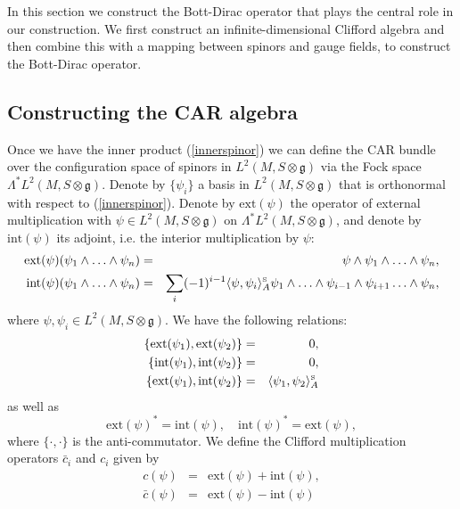 \documentclass[12pt]{article}
\newcommand{\nn}{\nonumber}
\begin{document}
In this section we construct the Bott-Dirac operator that plays the central role in our construction. We first construct an infinite-dimensional Clifford algebra and then combine this with a mapping between spinors and gauge fields, to construct the Bott-Dirac operator. 






\subsection{Constructing the CAR algebra}




Once we have the inner product (\ref{innerspinor}) we can define the CAR bundle over the configuration space of spinors in $L^2(M,S\otimes \mathfrak{g})$ via the Fock space $\Lambda^* L^2(M,S\otimes \mathfrak{g})$. Denote by $\{\psi_i\}$ a basis in $L^2(M,S\otimes \mathfrak{g})$ that is orthonormal with respect to (\ref{innerspinor}).
Denote by $\mbox{ext}(\psi)$ the operator of external multiplication with $\psi\in L^2(M,S\otimes \mathfrak{g})$ on $\Lambda^*L^2(M,S\otimes \mathfrak{g})$, and denote by $\mbox{int}(\psi)$ its adjoint, i.e. the interior multiplication by $\psi$:
\begin{eqnarray}
\mbox{ext}(\psi) (\psi_1 \wedge  \ldots \wedge \psi_n) &=&  \psi\wedge \psi_1 \wedge  \ldots \wedge \psi_n,
\nn\\
\mbox{int} (\psi) (\psi_1 \wedge  \ldots \wedge \psi_n) &=& \sum_i (-1)^{i-1} \langle \psi, \psi_i \rangle_A^{\mbox{\tiny S}} \psi_1 \wedge \ldots \wedge \psi_{i-1} \wedge \psi_{i+1} \ldots \wedge \psi_n,
\nn
\end{eqnarray}
where $\psi, \psi_i\in L^2(M,S\otimes \mathfrak{g})$. We have the following relations:
\begin{eqnarray}
\{\mbox{ext}(\psi_1), \mbox{ext}(\psi_2)  \} &=& 0,
\nn\\
\{\mbox{int}(\psi_1), \mbox{int}(\psi_2)  \} &=& 0,
\nn\\
\{\mbox{ext}(\psi_1), \mbox{int}(\psi_2)  \} &=& \langle \psi_1, \psi_2 \rangle_A^{\mbox{\tiny S}}  
\end{eqnarray}
as well as
$$
\mbox{ext}(\psi)^* = \mbox{int}(\psi),\quad \mbox{int}(\psi)^* = \mbox{ext}(\psi),
$$
where $\{\cdot,\cdot\}$ is the anti-commutator. We define  the Clifford multiplication operators $\bar{c}_i$ and $c_i$ given by
\begin{eqnarray}
  c(\psi) &=& \mbox{ext}(\psi) + \mbox{int}(\psi),
\nn\\
 \bar{c}(\psi) &=& \mbox{ext}(\psi) - \mbox{int}(\psi) 
\end{eqnarray}
\end{document}
